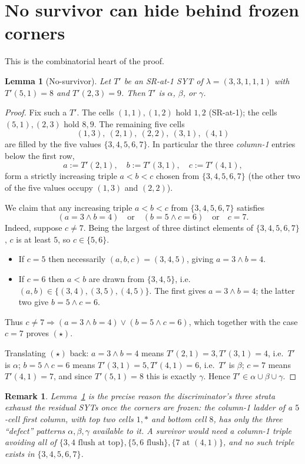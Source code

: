 \documentclass[11pt]{article}
\newtheorem{lemma}{Lemma}
\newtheorem*{remark}{Remark}
\begin{document}
\section{No survivor can hide behind frozen corners}

This is the combinatorial heart of the proof.

\begin{lemma}[No-survivor]\label{lem:nosurv}
Let $T'$ be an SR-at-1 SYT of $\lambda=(3,3,1,1,1)$ with $T'(5,1)=8$ and
$T'(2,3)=9$. Then $T'$ is $\alpha$, $\beta$, or $\gamma$.
\end{lemma}

\begin{proof}
Fix such a $T'$. The cells $(1,1),(1,2)$ hold $1,2$ (SR-at-1); the cells
$(5,1),(2,3)$ hold $8,9$. The remaining five cells
\[
(1,3),\ (2,1),\ (2,2),\ (3,1),\ (4,1)
\]
are filled by the five values $\{3,4,5,6,7\}$. In particular the three
\emph{column-1} entries below the first row,
\[
a:=T'(2,1),\quad b:=T'(3,1),\quad c:=T'(4,1),
\]
form a strictly increasing triple $a<b<c$ chosen from $\{3,4,5,6,7\}$ (the
other two of the five values occupy $(1,3)$ and $(2,2)$).

We claim that any increasing triple $a<b<c$ from $\{3,4,5,6,7\}$ satisfies
\[
(a=3\wedge b=4)\quad\text{or}\quad(b=5\wedge c=6)\quad\text{or}\quad c=7 .
\tag{$\star$}
\]
Indeed, suppose $c\neq 7$. Being the largest of three distinct elements of
$\{3,4,5,6,7\}$, $c$ is at least $5$, so $c\in\{5,6\}$.
\begin{itemize}
\item If $c=5$ then necessarily $(a,b,c)=(3,4,5)$, giving $a=3\wedge b=4$.
\item If $c=6$ then $a<b$ are drawn from $\{3,4,5\}$, i.e.\
  $(a,b)\in\{(3,4),(3,5),(4,5)\}$. The first gives $a=3\wedge b=4$; the latter
  two give $b=5\wedge c=6$.
\end{itemize}
Thus $c\neq 7\Rightarrow (a=3\wedge b=4)\vee(b=5\wedge c=6)$, which together
with the case $c=7$ proves $(\star)$.

Translating $(\star)$ back: $a=3\wedge b=4$ means $T'(2,1)=3,T'(3,1)=4$, i.e.\
$T'$ is $\alpha$; $b=5\wedge c=6$ means $T'(3,1)=5,T'(4,1)=6$, i.e.\ $T'$ is
$\beta$; $c=7$ means $T'(4,1)=7$, and since $T'(5,1)=8$ this is exactly
$\gamma$. Hence $T'\in\alpha\cup\beta\cup\gamma$.
\end{proof}

\begin{remark}
Lemma~\ref{lem:nosurv} is the precise reason the discriminator's three strata
exhaust the residual SYTs once the corners are frozen: the column-1 ladder of a
$5$-cell first column, with top two cells $1,\ast$ and bottom cell $8$, has only
the three ``defect'' patterns $\alpha,\beta,\gamma$ available to it. A
survivor would need a column-1 triple avoiding all of
$\{3,4\text{ flush at top}\},\{5,6\text{ flush}\},\{7\text{ at }(4,1)\}$, and no
such triple exists in $\{3,4,5,6,7\}$.
\end{remark}
\end{document}
